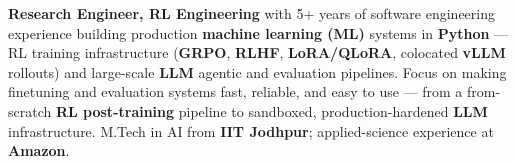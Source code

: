 \documentclass[letter,10pt]{article}
\begin{document}

\textbf{Research Engineer, RL Engineering} with 5+ years of software engineering experience building production \textbf{machine learning (ML)} systems in \textbf{Python} — RL training infrastructure (\textbf{GRPO}, \textbf{RLHF}, \textbf{LoRA/QLoRA}, colocated \textbf{vLLM} rollouts) and large-scale \textbf{LLM} agentic and evaluation pipelines.
Focus on making finetuning and evaluation systems fast, reliable, and easy to use — from a from-scratch \textbf{RL post-training} pipeline to sandboxed, production-hardened \textbf{LLM} infrastructure.
M.Tech in AI from \textbf{IIT Jodhpur}; applied-science experience at \textbf{Amazon}.
\end{document}

